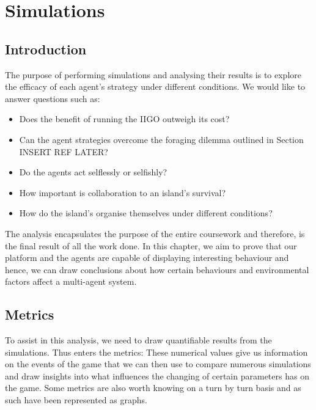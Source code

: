 \chapter{Simulations}
\section{Introduction}
\label{sec:Simulations:Intro}

The purpose of performing simulations and analysing their results is to explore the efficacy of each agent's strategy under different conditions. We would like to answer questions such as: 

\begin{itemize}
    \item Does the benefit of running the IIGO outweigh its cost? 
    \item Can the agent strategies overcome the foraging dilemma outlined in Section INSERT REF LATER? 
    \item Do the agents act selflessly or selfishly?
    \item How important is collaboration to an island's survival?
    \item How do the island's organise themselves under different conditions? %
\end{itemize}

The analysis encapsulates the purpose of the entire coursework and therefore, is the final result of all the work done. In this chapter, we aim to prove that our platform and the agents are capable of displaying interesting behaviour and hence, we can draw conclusions about how certain behaviours and environmental factors affect a multi-agent system.

\section{Metrics}
\label{sec:Simulations:Metric}

To assist in this analysis, we need to draw quantifiable results from the simulations. Thus enters the metrics: These numerical values give us information on the events of the game that we can then use to compare numerous simulations and draw insights into what influences the changing of certain parameters has on the game. Some metrics are also worth knowing on a turn by turn basis and as such have been represented as graphs. 


